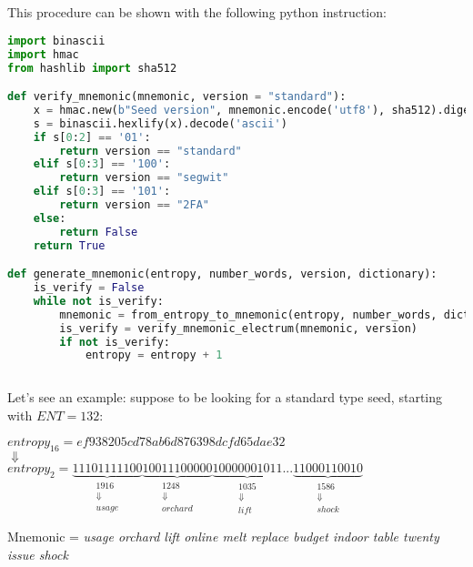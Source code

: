 \\ \\ 
This procedure can be shown with the following python instruction:
\begin{lstlisting}[language=Python]
import binascii
import hmac
from hashlib import sha512

def verify_mnemonic(mnemonic, version = "standard"):
	x = hmac.new(b"Seed version", mnemonic.encode('utf8'), sha512).digest()
	s = binascii.hexlify(x).decode('ascii')
	if s[0:2] == '01':
		return version == "standard"
	elif s[0:3] == '100':
		return version == "segwit"
	elif s[0:3] == '101':
		return version == "2FA"
	else:
		return False
	return True

def generate_mnemonic(entropy, number_words, version, dictionary):	
	is_verify = False
	while not is_verify:
		mnemonic = from_entropy_to_mnemonic(entropy, number_words, dictionary)
		is_verify = verify_mnemonic_electrum(mnemonic, version)
		if not is_verify:
			entropy = entropy + 1
		
\end{lstlisting}

\begin{flushleft}
	Let's see an example: suppose to be looking for a standard type seed, starting with $ENT=132$:
\end{flushleft}

\begin{center} 
	$ entropy_{16} = ef938205cd78ab6d876398dcfd65dae32 $ 
	\\
	$\Downarrow $
	\\
	$entropy_{2}= \underbrace{11101111100}_{\substack{1916 \\ \Downarrow\\ usage} }
	\underbrace{10011100000}_{\substack{1248 \\ \Downarrow\\ orchard}}
	\underbrace{10000001011}_{\substack{1035 \\ \Downarrow\\ lift}}
	...
	\underbrace{11000110010}_{\substack{1586 \\ \Downarrow\\ shock}}  $
\end{center}
Mnemonic = \textit{usage orchard lift online melt replace budget indoor table twenty issue shock}

